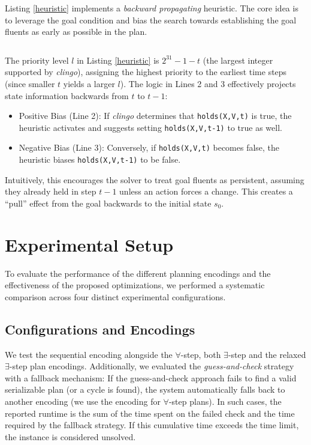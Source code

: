 \documentclass[
     11pt,                    %
     a4paper,             %
     BCOR=10mm,     %
     DIV=14,                 %
     listof=totoc,                    %
     bibliography=totoc,       %
     index=totoc,              %
     parskip            %
     twoside,
     headsepline
     ]{scrreprt}
\theoremstyle{definition}
\theoremstyle{definition}
\theoremstyle{remark}
\theoremstyle{bfnote}
\begin{document}
Listing \ref{heuristic} implements a \textit{backward propagating} heuristic.
The core idea is to leverage the goal condition and bias the search towards establishing the goal fluents as early as possible in the plan.
\begin{listing}[H]
  \caption{Backward Propagating Heuristic}
  \inputminted[frame=single,framesep=2mm,baselinestretch=1.2,linenos]{prolog}{encodings/heuristic.lp}
  \label{heuristic}
\end{listing}

The priority level $l$ in Listing \ref{heuristic} is $2^{31}-1-t$ (the largest integer supported by \textit{clingo}), assigning the highest priority to the earliest time steps (since smaller $t$ yields a larger $l$).
The logic in Lines 2 and 3 effectively projects state information backwards from $t$ to $t-1$:
\begin{itemize}
    \item Positive Bias (Line 2): If \textit{clingo} determines that \texttt{holds(X,V,t)} is true, the heuristic activates and suggests setting \texttt{holds(X,V,t-1)} to true as well.
    \item Negative Bias (Line 3): Conversely, if \texttt{holds(X,V,t)} becomes false, the heuristic biases \texttt{holds(X,V,t-1)} to be false.
\end{itemize} 
Intuitively, this encourages the solver to treat goal fluents as persistent, assuming they already held in step $t-1$ unless an action forces a change.
This creates a \enquote{pull} effect from the goal backwards to the initial state $s_0$.


\section{Experimental Setup}
To evaluate the performance of the different planning encodings and the effectiveness of the proposed optimizations, we performed a systematic comparison across four distinct experimental configurations.

\subsection{Configurations and Encodings}
We test the sequential encoding alongside the $\forall$-step, both $\exists$-step and the relaxed $\exists$-step plan encodings. 
Additionally, we evaluated the \textit{guess-and-check} strategy with a fallback mechanism: If the guess-and-check approach fails to find a valid serializable plan (or a cycle is found), the system automatically falls back to another encoding (we use the encoding for $\forall$-step plans). In such cases, the reported runtime is the sum of the time spent on the failed check and the time required by the fallback strategy. If this cumulative time exceeds the time limit, the instance is considered unsolved.
\end{document}
